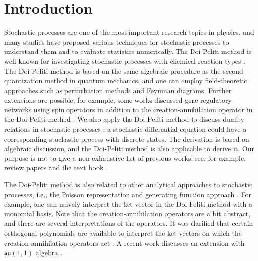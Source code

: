 \documentclass[sn-mathphys,Numbered]{sn-jnl}%
\theoremstyle{thmstyleone}%
\theoremstyle{thmstyletwo}%
\theoremstyle{thmstylethree}%
\begin{document}


\maketitle


\section{Introduction}

Stochastic processes are one of the most important research topics in physics, and many studies have proposed various techniques for stochastic processes to understand them and to evaluate statistics numerically. The Doi-Peliti method is well-known for investigating stochastic processes with chemical reaction types \cite{Doi1976a,Doi1976b,Peliti1985}. The Doi-Peliti method is based on the same algebraic procedure as the second-quantization method in quantum mechanics, and one can employ field-theoretic approaches such as perturbation methods and Feynman diagrams. Further extensions are possible; for example, some works discussed gene regulatory networks using spin operators in addition to the creation-annihilation operator in the Doi-Peliti method \cite{Sasai2003,Bhattacharyya2020}. We also apply the Doi-Peliti method to discuss duality relations in stochastic processes \cite{Ohkubo2010}; a stochastic differential equation could have a corresponding stochastic process with discrete states. The derivation is based on algebraic discussion, and the Doi-Peliti method is also applicable to derive it. Our purpose is not to give a non-exhaustive list of previous works; see, for example, review papers \cite{Tauber2005,Weber2017} and the text book \cite{Altland2010}.

The Doi-Peliti method is also related to other analytical approaches to stochastic processes, i.e., the Poisson representation and generating function approach \cite{Droz1994,Deloubriere2002, Weber2017}. For example, one can naively interpret the ket vector in the Doi-Peliti method with a monomial basis. Note that the creation-annihilation operators are a bit abstract, and there are several interpretations of the operators. It was clarified that certain orthogonal polynomials are available to interpret the ket vectors on which the creation-annihilation operators act \cite{Ohkubo2012}. A recent work discusses an extension with $\mathfrak{su}(1,1)$ algebra \cite{Greenman2022}.
\end{document}
